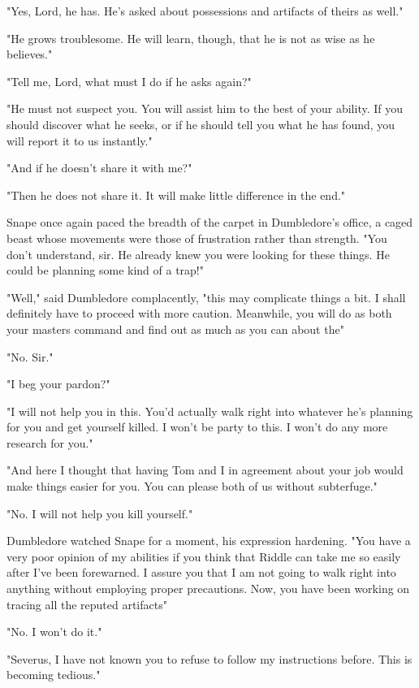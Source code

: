 "Yes, Lord, he has. He's asked about possessions and artifacts of theirs as well."

"He grows troublesome. He will learn, though, that he is not as wise as he believes."

"Tell me, Lord, what must I do if he asks again?"

"He must not suspect you. You will assist him to the best of your ability. If you should discover what he seeks, or if he should tell you what he has found, you will report it to us instantly."

"And if he doesn't share it with me?"

"Then he does not share it. It will make little difference in the end."

\sbreak

Snape once again paced the breadth of the carpet in Dumbledore's office, a caged beast whose movements were those of frustration rather than strength. "You don't understand, sir. He already knew you were looking for these things. He could be planning some kind of a trap!"

"Well," said Dumbledore complacently, "this may complicate things a bit. I shall definitely have to proceed with more caution. Meanwhile, you will do as both your masters command and find out as much as you can about the{\el}"

"No. Sir."

"I beg your pardon?"

"I will not help you in this. You'd actually walk right into whatever he's planning for you and get yourself killed. I won't be party to this. I won't do any more research for you."

"And here I thought that having Tom and I in agreement about your job would make things easier for you. You can please both of us without subterfuge."

"No. I will not help you kill yourself."

Dumbledore watched Snape for a moment, his expression hardening. "You have a very poor opinion of my abilities if you think that Riddle can take me so easily after I've been forewarned. I assure you that I am not going to walk right into anything without employing proper precautions. Now, you have been working on tracing all the reputed artifacts{\el}"

"No. I won't do it."

"Severus, I have not known you to refuse to follow my instructions before. This is becoming tedious."

